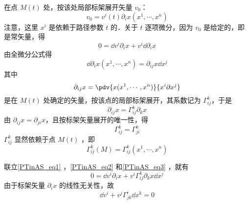 在点 $M(t)$ 处，按该处局部标架展开矢量 $v_0$：
\begin{equation}
v_0=v^i(t)\partial_i x(x^1,\cdots,x^n)
\end{equation}
注意，这里 $x^i$ 是依赖于路径参数 $t$ 的．关于 $t$ 逐项微分，因为 $v_0$ 是给定的，即是常矢量，得
\begin{equation}\label{PTinAS_eq1}
0=\dd v^i\partial_i x+v^i\dd \partial_i x
\end{equation}
由全微分公式得
\begin{equation}\label{PTinAS_eq2}
\dd \partial_i x(x^1,\cdots,x^n)=\partial_{ij}x\dd x^j
\end{equation}
其中
\begin{equation}
\partial_{ij}x=\pdv{x(x^1,\cdots,x^n)}{x^i\partial x^j}
\end{equation}
是在 $M(t)$ 处确定的矢量，按该点的局部标架展开，其系数记为 $\Gamma^k_{ij}$，于是
\begin{equation}\label{PTinAS_eq3}
\partial_{ij}x=\Gamma^k_{ij}\partial_k x
\end{equation}
由 $\partial_{ij} x=\partial_{ji} x$，且按标架矢量展开的唯一性，得
\begin{equation}
\Gamma^k_{ij}=\Gamma^k_{ji}
\end{equation}
 $\Gamma^k_{ij}$ 显然依赖于点 $M(t)$ ，即
 \begin{equation}
 \Gamma^k_{ij}(M)=\Gamma^k_{ij}(x^1,\cdots,x^n)
 \end{equation}
 
联立\autoref{PTinAS_eq1} ，\autoref{PTinAS_eq2} 和\autoref{PTinAS_eq3} ，就有
\begin{equation}
0=\dd v^i\partial_i x+v^i\Gamma^k_{ij}\partial_k x\dd x^j
\end{equation}
由于标架矢量 $\partial_i x$ 的线性无关性，故
\begin{equation}
\dd v^i+v^j\Gamma^i_{jk}\dd x^k=0
\end{equation}
